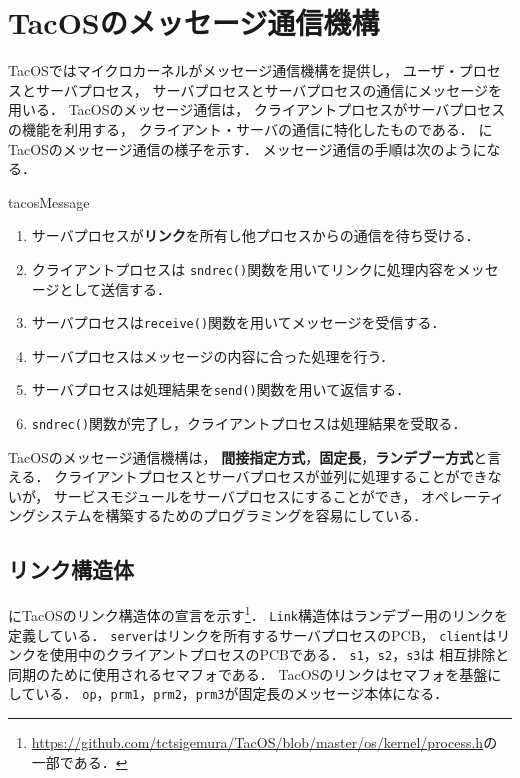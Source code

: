 \section{TacOSのメッセージ通信機構}
TacOSではマイクロカーネルがメッセージ通信機構を提供し，
ユーザ・プロセスとサーバプロセス，
サーバプロセスとサーバプロセスの通信にメッセージを用いる．
TacOSのメッセージ通信は，
クライアントプロセスがサーバプロセスの機能を利用する，
クライアント・サーバの通信に特化したものである．
にTacOSのメッセージ通信の様子を示す．
メッセージ通信の手順は次のようになる．

{tacosMessage}

\begin{enumerate}
\item サーバプロセスが{\bf リンク}を所有し他プロセスからの通信を待ち受ける．
\item クライアントプロセスは
{\tt sndrec()}関数を用いてリンクに処理内容をメッセージとして送信する．
\item サーバプロセスは{\tt receive()}関数を用いてメッセージを受信する．
\item サーバプロセスはメッセージの内容に合った処理を行う．
\item サーバプロセスは処理結果を{\tt send()}関数を用いて返信する．
\item {\tt sndrec()}関数が完了し，クライアントプロセスは処理結果を受取る．
\end{enumerate}

TacOSのメッセージ通信機構は，
{\bf 間接指定方式}，{\bf 固定長}，{\bf ランデブー方式}と言える．
クライアントプロセスとサーバプロセスが並列に処理することができないが，
サービスモジュールをサーバプロセスにすることができ，
オペレーティングシステムを構築するためのプログラミングを容易にしている．

\subsection{リンク構造体}
にTacOSのリンク構造体の宣言を示す\footnote{
\url{https://github.com/tctsigemura/TacOS/blob/master/os/kernel/process.h}の
一部である．}．
{\tt Link}構造体はランデブー用のリンクを定義している．
{\tt server}はリンクを所有するサーバプロセスのPCB，
{\tt client}はリンクを使用中のクライアントプロセスのPCBである．
{\tt s1}，{\tt s2}，{\tt s3}は
相互排除と同期のために使用されるセマフォである．
TacOSのリンクはセマフォを基盤にしている．
{\tt op}，{\tt prm1}，{\tt prm2}，{\tt prm3}が固定長のメッセージ本体になる．

